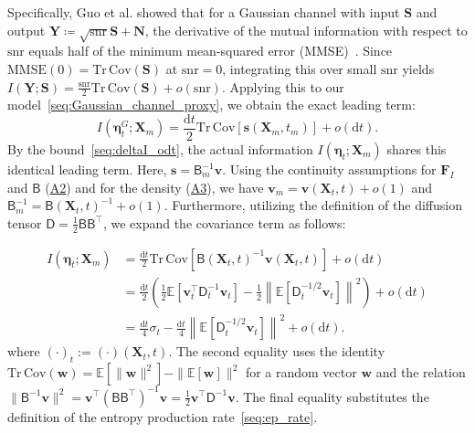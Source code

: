 \documentclass[
 longbibliography,
 twocolumn,
 superscriptaddress,
 amsmath,
 amssymb,
 amsthm,
 amsfonts,
 prl,
 floatfix,
]{revtex4-2}
\newcommand{\matbf}[1]{\boldsymbol{\mathsf{#1}}}
\begin{document}
\begin{widetext}
Specifically, Guo et al. showed that for a Gaussian channel with input $\bm S$ and output $\bm Y \coloneq \sqrt{\mathrm{snr}}\bm S + \bm N$, the derivative of the mutual information with respect to $\mathrm{snr}$ equals half of the minimum mean-squared error (MMSE)~\cite{guo2005mutual}. Since $\mathrm{MMSE}(0) = \mathrm{Tr}\,\mathrm{Cov}(\bm S)$ at $\mathrm{snr}=0$, integrating this over small $\mathrm{snr}$ yields $I(\bm Y; \bm S) = \frac{\mathrm{snr}}{2}\mathrm{Tr}\,\mathrm{Cov}(\bm S) + o(\mathrm{snr})$. Applying this to our model~\eqref{seq:Gaussian_channel_proxy}, we obtain the exact leading term:
\begin{equation}
    I(\bm{\eta}_t^G;\bm{X}_m)
    =\frac{\mathrm{d}t}{2}\mathrm{Tr}\,\mathrm{Cov}\left[
    \bm{s}(\bm{X}_m,t_m)
    \right]+o(\mathrm{d}t).
    \label{seq:I_G_I_MMSE}
\end{equation}
By the bound~\eqref{seq:deltaI_odt}, the actual information $I(\bm\eta_t;\bm X_m)$ shares this identical leading term. Here, $\bm s = \matbf B_m^{-1}\bm v$. Using the continuity assumptions for $\bm F_I$ and $\matbf B$ (\hyperlink{assumption:A2}{A2}) and for the density (\hyperlink{assumption:A3}{A3}), we have $\bm v_m = \bm v(\bm X_t, t) + o(1)$ and $\matbf B_m^{-1} = \matbf B(\bm X_t, t)^{-1} + o(1)$. Furthermore, utilizing the definition of the diffusion tensor $\matbf{D} = \frac{1}{2}\matbf{B}\matbf{B}^\intercal$, we expand the covariance term as follows:

\begin{equation}
\begin{aligned}
    I(\bm\eta_t;\bm{X}_m)
    &=\frac{\mathrm dt}{2}\mathrm{Tr}\,\mathrm{Cov}\left[
    \matbf B(\bm X_t,t)^{-1}\bm v(\bm X_t,t)\right]
    +o(\mathrm dt)
    \\
    &=\frac{\mathrm dt}{2}\left(
    \frac{1}{2}\mathbb E\!\left[
    \bm v_t^\intercal\matbf D_t^{-1}\bm v_t
    \right]
    -\frac{1}{2}\left\|\mathbb E[\matbf D_t^{-1/2}\bm v_t]\right\|^2
    \right)+o(\mathrm dt)
    \\
    &=\frac{\mathrm dt}{4}\sigma_t
    -\frac{\mathrm dt}{4}\left\|\mathbb E[\matbf D_t^{-1/2}\bm v_t]\right\|^2
    +o(\mathrm dt).
\end{aligned}
    \label{seq:I_EP_relation}
\end{equation}
where $(\cdot)_t := (\cdot)(\bm X_t, t)$. The second equality uses the identity $\mathrm{Tr}\,\mathrm{Cov}(\bm w) = \mathbb E[\|\bm w\|^2] - \|\mathbb E[\bm w]\|^2$ for a random vector $\bm w$ and the relation $\|\matbf B^{-1}\bm v\|^2 = \bm v^\intercal (\matbf B \matbf B^\intercal)^{-1} \bm v = \frac{1}{2}\bm v^\intercal \matbf D^{-1} \bm v$. The final equality substitutes the definition of the entropy production rate~\eqref{seq:ep_rate}.


\end{widetext}
\end{document}
